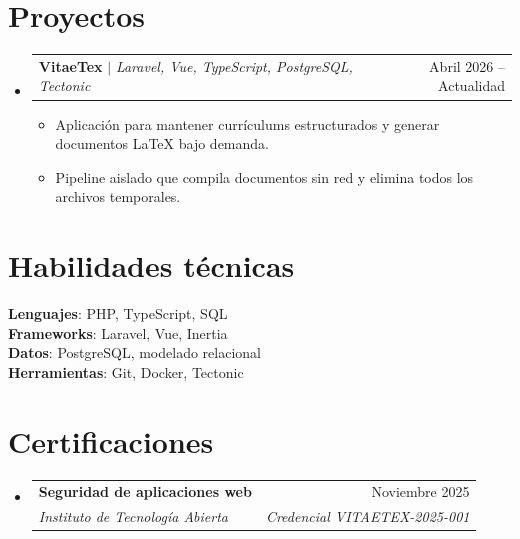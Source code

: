\documentclass[a4paper,11pt]{article}
\makeatletter
\newcommand{\resumeItem}[1]{
  \item\small{{#1 \vspace{-2pt}}}
}
\newcommand{\resumeSubheading}[4]{
  \vspace{-2pt}\item
    \begin{tabular*}{0.97\textwidth}[t]{l@{\extracolsep{\fill}}r}
      \textbf{#1} & #2 \\
      \textit{\small #3} & \textit{\small #4} \\
    \end{tabular*}\vspace{-7pt}
}
\newcommand{\resumeProjectHeading}[2]{
  \item
    \begin{tabular*}{0.97\textwidth}{l@{\extracolsep{\fill}}r}
      \small #1 & #2 \\
    \end{tabular*}\vspace{-7pt}
}
\newcommand{\resumeSubHeadingListStart}{\begin{itemize}[leftmargin=0.15in,label={}]}
\newcommand{\resumeSubHeadingListEnd}{\end{itemize}}
\newcommand{\resumeItemListStart}{\begin{itemize}}
\newcommand{\resumeItemListEnd}{\end{itemize}\vspace{-5pt}}
\makeatother
\begin{document}
\section{Proyectos}
\resumeSubHeadingListStart
  \resumeProjectHeading
    {\textbf{VitaeTex} $|$ \emph{Laravel, Vue, TypeScript, PostgreSQL, Tectonic}}
    {Abril 2026 -- Actualidad}
  \resumeItemListStart
    \resumeItem{Aplicación para mantener currículums estructurados y generar documentos LaTeX bajo demanda.}
    \resumeItem{Pipeline aislado que compila documentos sin red y elimina todos los archivos temporales.}
  \resumeItemListEnd
\resumeSubHeadingListEnd

\section{Habilidades técnicas}
\begin{itemize}[leftmargin=0.15in,label={}]
  \small{\item{
    \textbf{Lenguajes}: PHP, TypeScript, SQL \\
    \textbf{Frameworks}: Laravel, Vue, Inertia \\
    \textbf{Datos}: PostgreSQL, modelado relacional \\
    \textbf{Herramientas}: Git, Docker, Tectonic
  }}
\end{itemize}

\section{Certificaciones}
\resumeSubHeadingListStart
  \resumeSubheading
    {Seguridad de aplicaciones web}{Noviembre 2025}
    {Instituto de Tecnología Abierta}{Credencial VITAETEX-2025-001}
\resumeSubHeadingListEnd
\end{document}
